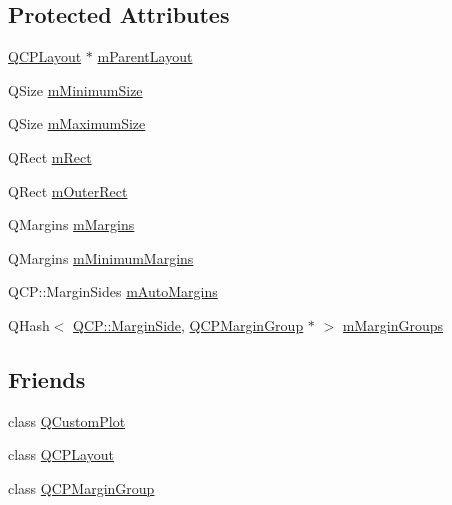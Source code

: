 \subsection*{Protected Attributes}
\begin{DoxyCompactItemize}
\item 
\hyperlink{class_q_c_p_layout}{Q\+C\+P\+Layout} $\ast$ \hyperlink{class_q_c_p_layout_element_ae7c75c25549608bd688bdb65d4c38066}{m\+Parent\+Layout}
\item 
Q\+Size \hyperlink{class_q_c_p_layout_element_affef747c81632de33f08483b7fd10d01}{m\+Minimum\+Size}
\item 
Q\+Size \hyperlink{class_q_c_p_layout_element_a64a387973fd4addac842028c89088998}{m\+Maximum\+Size}
\item 
Q\+Rect \hyperlink{class_q_c_p_layout_element_ad8896f05550389f7b9e92c9e6cdf6e01}{m\+Rect}
\item 
Q\+Rect \hyperlink{class_q_c_p_layout_element_a07bb4973379e75cb0fa5b032c1d24afd}{m\+Outer\+Rect}
\item 
Q\+Margins \hyperlink{class_q_c_p_layout_element_ac2a32b99ee527ca5dfff9da03628fe94}{m\+Margins}
\item 
Q\+Margins \hyperlink{class_q_c_p_layout_element_a5ba71f25d1af4bb092b28df618538e63}{m\+Minimum\+Margins}
\item 
Q\+C\+P\+::\+Margin\+Sides \hyperlink{class_q_c_p_layout_element_af61c70354d1275778d68206b2a1b2d36}{m\+Auto\+Margins}
\item 
Q\+Hash$<$ \hyperlink{namespace_q_c_p_a7e487e3e2ccb62ab7771065bab7cae54}{Q\+C\+P\+::\+Margin\+Side}, \hyperlink{class_q_c_p_margin_group}{Q\+C\+P\+Margin\+Group} $\ast$ $>$ \hyperlink{class_q_c_p_layout_element_aeafbbc1130e02eee663c5326761fc963}{m\+Margin\+Groups}
\end{DoxyCompactItemize}
\subsection*{Friends}
\begin{DoxyCompactItemize}
\item 
class \hyperlink{class_q_c_p_layout_element_a1cdf9df76adcfae45261690aa0ca2198}{Q\+Custom\+Plot}
\item 
class \hyperlink{class_q_c_p_layout_element_a588aac0a0d721f6c5f10126d8596a20f}{Q\+C\+P\+Layout}
\item 
class \hyperlink{class_q_c_p_layout_element_ad077a686e85ab6fa03dcb2fd37fc499a}{Q\+C\+P\+Margin\+Group}
\end{DoxyCompactItemize}
